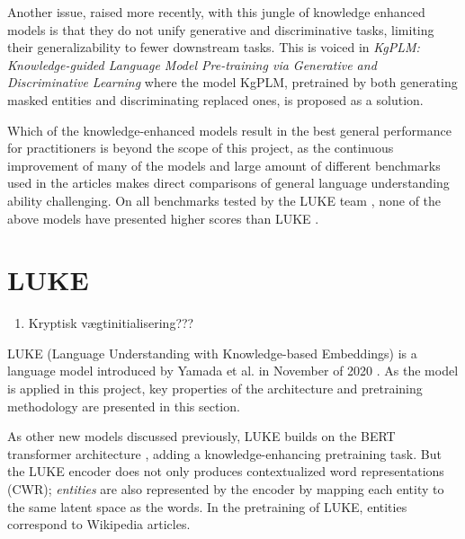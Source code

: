 \documentclass[main.tex]{subfiles}
\begin{document}
Another issue, raised more recently, with this jungle of knowledge enhanced models is that they do not unify generative and discriminative tasks, limiting their generalizability to fewer downstream tasks.
This is voiced in \emph{KgPLM: Knowledge-guided Language Model Pre-training via Generative and Discriminative Learning} \cite{he2020kgplm} where the model KgPLM, pretrained by both generating masked entities and discriminating replaced ones, is proposed as a solution.

Which of the knowledge-enhanced models result in the best general performance for practitioners is beyond the scope of this project, as the continuous improvement of many of the models and large amount of different benchmarks used in the articles makes direct comparisons of general language understanding ability challenging.
On all benchmarks tested by the LUKE team \cite{yamada2020luke}, none of the above models have presented higher scores than LUKE \cite[Sec. 4]{yamada2020luke}.


\section{LUKE}
\label{sec:LUKE}
\begin{enumerate}
    \item Kryptisk vægtinitialisering???
\end{enumerate}
LUKE (Language Understanding with Knowledge-based Embeddings) is a language model introduced by Yamada et al. in November of 2020 \cite{yamada2020luke}.
As the model is applied in this project, key properties of the architecture and pretraining methodology are presented in this section.

As other new models discussed previously, LUKE builds on the BERT transformer architecture \cite{devlin2019bert}, adding a knowledge-enhancing pretraining task.
But the LUKE encoder does not only produces contextualized word representations (CWR); 
\emph{entities} are also represented by the encoder by mapping each entity to the same latent space as the words.
In the pretraining of LUKE, entities correspond to Wikipedia articles.
\end{document}

